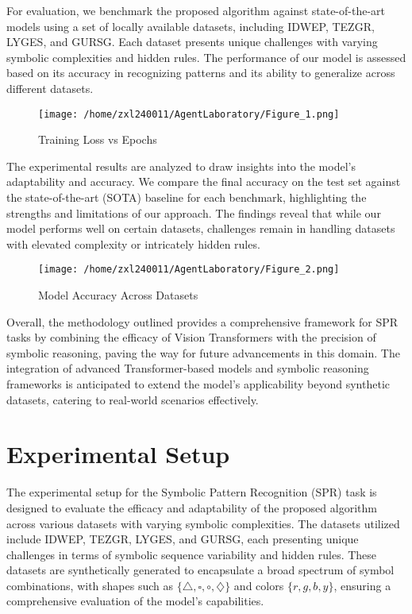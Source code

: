 \documentclass{article}
\begin{document}
For evaluation, we benchmark the proposed algorithm against state-of-the-art models using a set of locally available datasets, including IDWEP, TEZGR, LYGES, and GURSG. Each dataset presents unique challenges with varying symbolic complexities and hidden rules. The performance of our model is assessed based on its accuracy in recognizing patterns and its ability to generalize across different datasets.

\begin{figure}[h]
\caption{Training Loss vs Epochs}
\centering
\texttt{[image: /home/zxl240011/AgentLaboratory/Figure\_1.png]}
\label{fig:fig1}
\end{figure}

The experimental results are analyzed to draw insights into the model's adaptability and accuracy. We compare the final accuracy on the test set against the state-of-the-art (SOTA) baseline for each benchmark, highlighting the strengths and limitations of our approach. The findings reveal that while our model performs well on certain datasets, challenges remain in handling datasets with elevated complexity or intricately hidden rules.

\begin{figure}[h]
\caption{Model Accuracy Across Datasets}
\centering
\texttt{[image: /home/zxl240011/AgentLaboratory/Figure\_2.png]}
\label{fig:fig2}
\end{figure}

Overall, the methodology outlined provides a comprehensive framework for SPR tasks by combining the efficacy of Vision Transformers with the precision of symbolic reasoning, paving the way for future advancements in this domain. The integration of advanced Transformer-based models and symbolic reasoning frameworks is anticipated to extend the model's applicability beyond synthetic datasets, catering to real-world scenarios effectively.

\section{Experimental Setup}
The experimental setup for the Symbolic Pattern Recognition (SPR) task is designed to evaluate the efficacy and adaptability of the proposed algorithm across various datasets with varying symbolic complexities. The datasets utilized include IDWEP, TEZGR, LYGES, and GURSG, each presenting unique challenges in terms of symbolic sequence variability and hidden rules. These datasets are synthetically generated to encapsulate a broad spectrum of symbol combinations, with shapes such as \(\{\triangle, \square, \circ, \diamondsuit\}\) and colors \(\{r, g, b, y\}\), ensuring a comprehensive evaluation of the model's capabilities.
\end{document}
